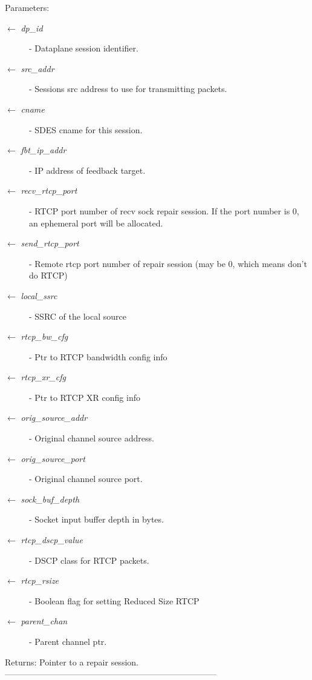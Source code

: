 \begin{Desc}
\item[Parameters:]
\begin{description}
\item[\mbox{$\leftarrow$} {\em dp\_\-id}]- Dataplane session identifier. \item[\mbox{$\leftarrow$} {\em src\_\-addr}]- Sessions src address to use for transmitting packets. \item[\mbox{$\leftarrow$} {\em cname}]- SDES cname for this session. \item[\mbox{$\leftarrow$} {\em fbt\_\-ip\_\-addr}]- IP address of feedback target. \item[\mbox{$\leftarrow$} {\em recv\_\-rtcp\_\-port}]- RTCP port number of recv sock repair session. If the port number is 0, an ephemeral port will be allocated. \item[\mbox{$\leftarrow$} {\em send\_\-rtcp\_\-port}]- Remote rtcp port number of repair session (may be 0, which means don't do RTCP) \item[\mbox{$\leftarrow$} {\em local\_\-ssrc}]- SSRC of the local source \item[\mbox{$\leftarrow$} {\em rtcp\_\-bw\_\-cfg}]- Ptr to RTCP bandwidth config info \item[\mbox{$\leftarrow$} {\em rtcp\_\-xr\_\-cfg}]- Ptr to RTCP XR config info \item[\mbox{$\leftarrow$} {\em orig\_\-source\_\-addr}]- Original channel source address. \item[\mbox{$\leftarrow$} {\em orig\_\-source\_\-port}]- Original channel source port. \item[\mbox{$\leftarrow$} {\em sock\_\-buf\_\-depth}]- Socket input buffer depth in bytes. \item[\mbox{$\leftarrow$} {\em rtcp\_\-dscp\_\-value}]- DSCP class for RTCP packets. \item[\mbox{$\leftarrow$} {\em rtcp\_\-rsize}]- Boolean flag for setting Reduced Size RTCP \item[\mbox{$\leftarrow$} {\em parent\_\-chan}]- Parent channel ptr. \end{description}
\end{Desc}
\begin{Desc}
\item[Returns:]Pointer to a repair session. --------------------------------------------------------------------------- \end{Desc}

